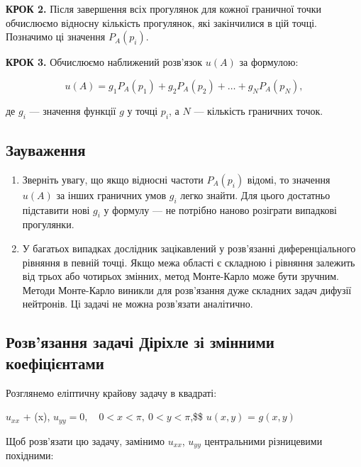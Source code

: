 \documentclass[
  ukrainian,
]{article}
\begin{document}
\textbf{КРОК 2.} Після завершення всіх прогулянок для кожної граничної
точки обчислюємо відносну кількість прогулянок, які закінчилися в цій
точці. Позначимо ці значення \(P_A(p_i)\).

\textbf{КРОК 3.} Обчислюємо наближений розв'язок \(u(A)\) за формулою:

\[
u(A) = g_1 P_A(p_1) + g_2 P_A(p_2) + \dots + g_N P_A(p_N),
\]

де \(g_i\) --- значення функції \(g\) у точці \(p_i\), а \(N\) ---
кількість граничних точок.

\subsection{Зауваження}\label{ux437ux430ux443ux432ux430ux436ux435ux43dux43dux44f-14}

\begin{enumerate}
\def\labelenumi{\arabic{enumi}.}
\item
  Зверніть увагу, що якщо відносні частоти \(P_A(p_i)\) відомі, то
  значення \(u(A)\) за інших граничних умов \(g_i\) легко знайти. Для
  цього достатньо підставити нові \(g_i\) у формулу --- не потрібно
  наново розіграти випадкові прогулянки.
\item
  У багатьох випадках дослідник зацікавлений у розв'язанні
  диференціального рівняння в певній точці. Якщо межа області є складною
  і рівняння залежить від трьох або чотирьох змінних, метод Монте-Карло
  може бути зручним. Методи Монте-Карло виникли для розв'язання дуже
  складних задач дифузії нейтронів. Ці задачі не можна розв'язати
  аналітично.
\end{enumerate}

\subsection{Розв'язання задачі Діріхле зі змінними
коефіцієнтами}\label{ux440ux43eux437ux432ux44fux437ux430ux43dux43dux44f-ux437ux430ux434ux430ux447ux456-ux434ux456ux440ux456ux445ux43bux435-ux437ux456-ux437ux43cux456ux43dux43dux438ux43cux438-ux43aux43eux435ux444ux456ux446ux456ux454ux43dux442ux430ux43cux438}

Розглянемо еліптичну крайову задачу в квадраті:

\(u_{xx}\) + (\sin x),
\(u_{yy} = 0, \quad 0 < x < \pi,\ 0 < y < \pi\),\$\$ \(u(x, y)\) =
\(g(x, y)\) \quad {}

Щоб розв'язати цю задачу, замінимо \(u_{xx}\), \(u_{yy}\) центральними
різницевими похідними:
\end{document}
